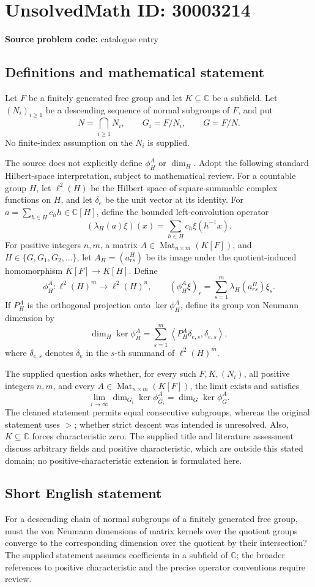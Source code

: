 \documentclass[11pt]{article}
\newcommand{\C}{\mathbb{C}}
\begin{document}
\section*{UnsolvedMath ID: 30003214}
\textbf{Source problem code:} catalogue entry
\subsection{Definitions and mathematical statement}
Let \(F\) be a finitely generated free group and let \(K\subseteq\C\) be a subfield. Let \((N_i)_{i\geq1}\) be a descending sequence of normal subgroups of \(F\), and put
\[
N=\bigcap_{i\geq1}N_i,\qquad G_i=F/N_i,\qquad G=F/N.
\]
No finite-index assumption on the \(N_i\) is supplied.

The source does not explicitly define \(\phi_H^A\) or \(\dim_H\). Adopt the following standard Hilbert-space interpretation, subject to mathematical review. For a countable group \(H\), let \(\ell^2(H)\) be the Hilbert space of square-summable complex functions on \(H\), and let \(\delta_e\) be the unit vector at its identity. For \(a=\sum_{h\in H}c_hh\in\C[H]\), define the bounded left-convolution operator
\[
(\lambda_H(a)\xi)(x)=\sum_{h\in H}c_h\xi(h^{-1}x).
\]
For positive integers \(n,m\), a matrix \(A\in\operatorname{Mat}_{n\times m}(K[F])\), and \(H\in\{G,G_1,G_2,\ldots\}\), let \(A_H=(a_{rs}^{H})\) be its image under the quotient-induced homomorphism \(K[F]\to K[H]\). Define
\[
\phi_H^A:\ell^2(H)^m\longrightarrow\ell^2(H)^n,
\qquad
(\phi_H^A\xi)_r=\sum_{s=1}^{m}\lambda_H(a_{rs}^{H})\xi_s.
\]
If \(P_H^A\) is the orthogonal projection onto \(\ker\phi_H^A\), define its group von Neumann dimension by
\[
\dim_H\ker\phi_H^A
=\sum_{s=1}^{m}\left\langle P_H^A\delta_{e,s},\delta_{e,s}\right\rangle,
\]
where \(\delta_{e,s}\) denotes \(\delta_e\) in the \(s\)-th summand of \(\ell^2(H)^m\).

The supplied question asks whether, for every such \(F,K,(N_i)\), all positive integers \(n,m\), and every \(A\in\operatorname{Mat}_{n\times m}(K[F])\), the limit exists and satisfies
\[
\lim_{i\to\infty}\dim_{G_i}\ker\phi_{G_i}^A
=\dim_G\ker\phi_G^A.
\]
The cleaned statement permits equal consecutive subgroups, whereas the original statement uses \(>\); whether strict descent was intended is unresolved. Also, \(K\subseteq\C\) forces characteristic zero. The supplied title and literature assessment discuss arbitrary fields and positive characteristic, which are outside this stated domain; no positive-characteristic extension is formulated here.
\subsection{Short English statement}
For a descending chain of normal subgroups of a finitely generated free group, must the von Neumann dimensions of matrix kernels over the quotient groups converge to the corresponding dimension over the quotient by their intersection? The supplied statement assumes coefficients in a subfield of \(\C\); the broader references to positive characteristic and the precise operator conventions require review.
\end{document}
